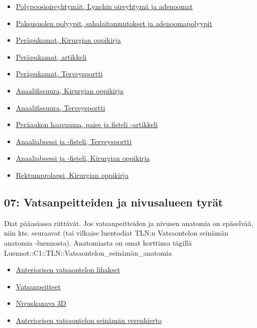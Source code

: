 \documentclass[
]{book}
\providecommand{\tightlist}{%
  \setlength{\itemsep}{0pt}\setlength{\parskip}{0pt}}
\begin{document}
\begin{itemize}
\tightlist
\item
  \href{https://www.oppiportti.fi/oppikirjat/kia00590}{Polypoosioireyhtymät, Lynchin oireyhtymä ja adenoomat}
\item
  \href{https://www.oppiportti.fi/oppikirjat/pat00470}{Paksusuolen polyypit, sahalaitamuutokset ja adenoomapolyypit}
\item
  \href{https://www.oppiportti.fi/oppikirjat/kia00611}{Peräpukamat, Kirurgian oppikirja}
\item
  \href{https://www.terveysportti.fi/apps/dtk/ltk/article/sll55439/}{Peräpukamat, artikkeli}
\item
  \href{https://www.terveysportti.fi/apps/dtk/ltk/article/sll55439/}{Peräpukamat, Terveysportti}
\item
  \href{https://www.oppiportti.fi/oppikirjat/kia00613}{Anaalifissuura, Kirurgian oppikirja}
\item
  \href{https://www.terveysportti.fi/apps/dtk/ltk/article/ykt00244/}{Anaalifissuura, Terveysportti}
\item
  \href{https://www.terveysportti.fi/apps/dtk/ltk/article/sll55440/}{Peräaukon haavauma, paise ja fisteli -artikkeli}
\item
  \href{https://www.terveysportti.fi/apps/dtk/ltk/article/ykt00245/}{Anaaliabsessi ja -fisteli, Terveysportti}
\item
  \href{https://www.oppiportti.fi/oppikirjat/kia00613}{Anaaliabsessi ja -fisteli, Kirurgian oppikirja}
\item
  \href{https://www.oppiportti.fi/oppikirjat/kia00602}{Rektumprolapsi, Kirurgian oppikirja}
\end{itemize}

\subsection{07: Vatsanpeitteiden ja nivusalueen tyrät}\label{Vatsanpeitteiden-ja-nivusalueen-tyrat}

Diat pääasiassa riittävät. Jos vatsanpeitteiden ja nivusen anatomia on epäselvää, niin kts. seuraavat (tai vilkaise luentodiat TLN:n Vatsaontelon seinämän anatomia -luennosta). Anatomiasta on omat korttinsa tägillä Luennot::C1::TLN::Vatsaontelon\_seinämän\_anatomia

\begin{itemize}
\tightlist
\item
  \href{https://youtu.be/mxOajxO8mX0?si=TcxLvzc5Y5DJCTJL}{Anteriorisen vatsaontelon lihakset}
\item
  \href{https://youtu.be/tXa4U5oztsg?si=Pbdo46RtM62vCvGW}{Vatsanpeitteet}
\item
  \href{https://youtu.be/XrUGnE_qf3w?si=mVk8VEJXUrxOOZoX}{Nivuskanava 3D}
\item
  \href{https://youtu.be/WauCWTXY-7c?si=-vHeJtWF4fvxxI46}{Anteriorisen vatsaontelon seinämän verenkierto}
\end{itemize}
\end{document}

